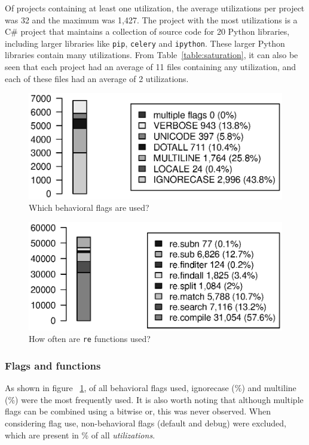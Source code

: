 Of projects containing at least one utilization, the average utilizations per project was 32 and the maximum  was 1,427.  The project with the most utilizations is a C\# project that maintains a collection of source code for 20 Python libraries, including larger libraries like {\tt pip}, {\tt celery} and {\tt ipython}.  These larger Python libraries contain many utilizations.
From Table~\ref{table:saturation}, it can also be seen that each project had an average of 11 files containing any utilization, and each of these files had an average of 2 utilizations.

\begin{figure}[tb]
\centering
\includegraphics[width=0.9\columnwidth]{nontex/illustrations/partFlags.eps}
\vspace{-6pt}
\caption{Which behavioral flags are used?}
\vspace{-6pt}
\label{fig:partFlags}
\end{figure}

\begin{figure}[tb]
\centering
\includegraphics[width=\columnwidth]{nontex/illustrations/partFunctions.eps}
\vspace{-12pt}
\caption{How often are  {\tt re} functions used?}
\vspace{-6pt}
\label{fig:partFunctions}
\end{figure}

\subsubsection{Flags and functions}
As shown in figure ~\ref{fig:partFlags}, of all behavioral flags used, ignorecase (\%) and multiline (\%) were the most frequently used.  It is also worth noting that although multiple flags can be combined using a bitwise or, this was never observed.
When considering flag use, non-behavioral flags (default and debug) were excluded, which are present in \% of all \emph{utilizations}.

